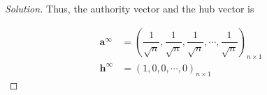 \documentclass{article}
\newenvironment{solution}{\begin{proof}[\noindent\it Solution]}{\end{proof}}
\newcommand{\bd}[1]{\boldsymbol{#1}}
\begin{document}
\begin{solution}
    \vspace{-2em} \hspace{2.6em}
    Thus, the authority vector and the hub vector is

    \vspace{-1.5em}
    \begin{align*}
        \bd{a}^{\infty} &= \left(
            \dfrac{1}{\sqrt{n}}, \dfrac{1}{\sqrt{n}}, \dfrac{1}{\sqrt{n}}, \cdots, \dfrac{1}{\sqrt{n}}
        \right)_{n\times 1} \\
        \bd{h}^{\infty} &= \left(
            1, 0, 0, \cdots, 0
        \right)_{n\times 1}
    \end{align*}

\vspace{-4.75em}
\end{solution}


\vspace{2em}
\end{document}
